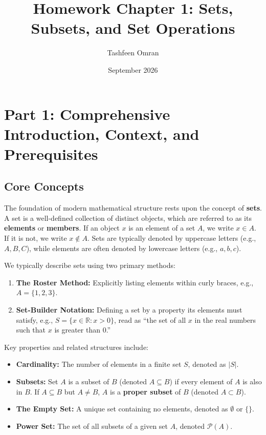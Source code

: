 \documentclass[12pt]{article}
\title{Homework Chapter 1: Sets, Subsets, and Set Operations}
\author{Tashfeen Omran}
\date{September 2026}
\begin{document}
\maketitle
\tableofcontents
\newpage

\section{Part 1: Comprehensive Introduction, Context, and Prerequisites}

\subsection{Core Concepts}
The foundation of modern mathematical structure rests upon the concept of \textbf{sets}. A set is a well-defined collection of distinct objects, which are referred to as its \textbf{elements} or \textbf{members}. If an object $x$ is an element of a set $A$, we write $x \in A$. If it is not, we write $x \notin A$. Sets are typically denoted by uppercase letters (e.g., $A, B, C$), while elements are often denoted by lowercase letters (e.g., $a, b, c$). 

We typically describe sets using two primary methods:
\begin{enumerate}
    \item \textbf{The Roster Method:} Explicitly listing elements within curly braces, e.g., $A = \{1, 2, 3\}$.
    \item \textbf{Set-Builder Notation:} Defining a set by a property its elements must satisfy, e.g., $S = \{x \in \mathbb{R} : x > 0\}$, read as ``the set of all $x$ in the real numbers such that $x$ is greater than 0.''
\end{enumerate}

Key properties and related structures include:
\begin{itemize}
    \item \textbf{Cardinality:} The number of elements in a finite set $S$, denoted as $|S|$.
    \item \textbf{Subsets:} Set $A$ is a subset of $B$ (denoted $A \subseteq B$) if every element of $A$ is also in $B$. If $A \subseteq B$ but $A \neq B$, $A$ is a \textbf{proper subset} of $B$ (denoted $A \subset B$).
    \item \textbf{The Empty Set:} A unique set containing no elements, denoted as $\emptyset$ or $\{\}$.
    \item \textbf{Power Set:} The set of all subsets of a given set $A$, denoted $\mathcal{P}(A)$.
\end{itemize}
\end{document}
